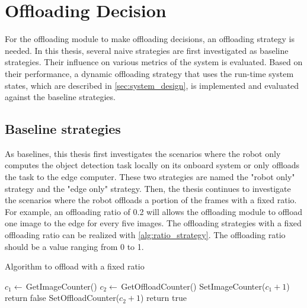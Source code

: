 \section{Offloading Decision}\label{sec:offloading_decision}

For the offloading module to make offloading decisions, an offloading strategy is needed. In this thesis, several naive strategies are first investigated as baseline strategies. Their influence on various metrics of the system is evaluated. Based on their performance, a dynamic offloading strategy that uses the run-time system states, which are described in \cref{sec:system_design}, is implemented and evaluated against the baseline strategies. 

\subsection{Baseline strategies}

As baselines, this thesis first investigates the scenarios where the robot only computes the object detection task locally on its onboard system or only offloads the task to the edge computer. These two strategies are named the "robot only" strategy and the "edge only" strategy. Then, the thesis continues to investigate the scenarios where the robot offloads a portion of the frames with a fixed ratio. For example, an offloading ratio of 0.2 will allows the offloading module to offload one image to the edge for every five images. The offloading strategies with a fixed offloading ratio can be realized with \cref{alg:ratio_strategy}. The offloading ratio should be a value ranging from 0 to 1. 

\begin{algorithm}[htp]
\caption{Algorithm to offload with a fixed ratio}\label{alg:ratio_strategy}
\begin{algorithmic}[1]
     
        \State $c_1 \gets \, $GetImageCounter()
        \State $c_2 \gets \, $GetOffloadCounter()
        \State SetImageCounter($c_1 + 1$) 
            \State return false 
        \Else
            \State SetOffloadCounter($c_2 + 1$)
            \State return true 
        \EndIf
    \EndFunction
\end{algorithmic}
\end{algorithm}

